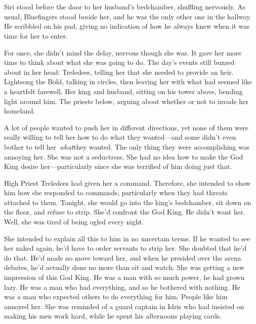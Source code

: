 \chapter{}

Siri stood before the door to her husband’s bedchamber, shuffling nervously. As usual, Bluefingers stood beside her, and he was the only other one in the hallway. He scribbled on his pad, giving no indication of how he always knew when it was time for her to enter.

For once, she didn’t mind the delay, nervous though she was. It gave her more time to think about what she was going to do. The day’s events still buzzed about in her head: Treledees, telling her that she needed to provide an heir. Lightsong the Bold, talking in circles, then leaving her with what had seemed like a heartfelt farewell. Her king and husband, sitting on his tower above, bending light around him. The priests below, arguing about whether or not to invade her homeland.

A lot of people wanted to push her in different directions, yet none of them were really willing to tell her how to do what they wanted—and some didn’t even bother to tell her~\textit{what}they wanted. The only thing they were accomplishing was annoying her. She was not a seductress. She had no idea how to make the God King desire her—particularly since she was terrified of him doing just that.

High Priest Treledees had given her a command. Therefore, she intended to show him how she responded to commands, particularly when they had threats attached to them. Tonight, she would go into the king’s bedchamber, sit down on the floor, and refuse to strip. She’d confront the God King. He didn’t want her. Well, she was tired of being ogled every night.

She intended to explain all this to him in no uncertain terms. If he wanted to see her naked again, he’d have to order servants to strip her. She doubted that he’d do that. He’d made no move toward her, and when he presided over the arena debates, he’d actually done no more than sit and watch. She was getting a new impression of this God King. He was a man with so much power, he had grown lazy. He was a man who had everything, and so he bothered with nothing. He was a man who expected others to do everything for him. People like him annoyed her. She was reminded of a guard captain in Idris who had insisted on making his men work hard, while he spent his afternoons playing cards.

